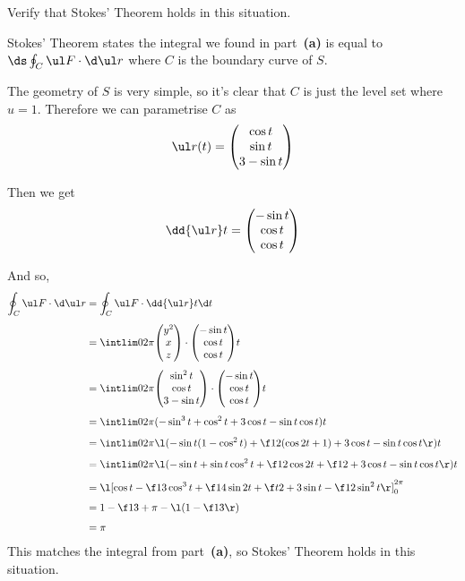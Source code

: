 \documentclass[a4paper]{article}
\begin{document}
\subsection{~} %

\begin{questionbody}
Verify that Stokes' Theorem holds in this situation.
\end{questionbody}

Stokes' Theorem states the integral we found in part~\textbf{(a)} is equal to $\ds \oint_C \ul F \cdot \d \ul r$ where $C$ is the boundary curve of $S$.

The geometry of $S$ is very simple, so it's clear that $C$ is just the level set where $u=1$. Therefore we can parametrise $C$ as \[ \ul r(t) = \begin{pmatrix} \cos t \\ \sin t \\ 3 - \sin t \end{pmatrix} \]

Then we get \[ \dd {\ul r}t = \begin{pmatrix} -\sin t \\ \cos t \\ \cos t \end{pmatrix} \]

And so, \begin{align*}
\oint_C \ul F \cdot \d \ul r &= \oint_C \ul F \cdot \dd {\ul r}t \d t \\[1ex]
&= \intlim 0{2\pi} {\begin{pmatrix} y^2 \\ x \\ z \end{pmatrix} \cdot \begin{pmatrix} -\sin t \\ \cos t \\ \cos t \end{pmatrix}} t \\[1ex]
&= \intlim 0{2\pi} {\begin{pmatrix} \sin^2 t \\ \cos t \\ 3 - \sin t \end{pmatrix} \cdot \begin{pmatrix} -\sin t \\ \cos t \\ \cos t \end{pmatrix}} t \\[1ex]
&= \intlim 0{2\pi} {(-\sin^3 t + \cos^2 t + 3 \cos t - \sin t \cos t)} t \\[1ex]
&= \intlim 0{2\pi} {\l( -\sin t (1 - \cos^2 t) + \f12 (\cos 2 t + 1) + 3 \cos t - \sin t \cos t \r)} t \\[1ex]
&= \intlim 0{2\pi} {\l( -\sin t + \sin t \cos^2 t + \f12 \cos 2 t + \f12 + 3 \cos t - \sin t \cos t \r)} t \\[1ex]
&= {\l[ \cos t - \f13 \cos^3 t + \f14 \sin 2t + \f t2 + 3 \sin t - \f12 \sin^2 t \r]}_0^{2\pi} \\[1ex]
&= 1 - \f13 + \pi - \l( 1 - \f13 \r) \\[1ex]
&= \pi
\end{align*}
This matches the integral from part~\textbf{(a)}, so Stokes' Theorem holds in this situation.
\end{document}
